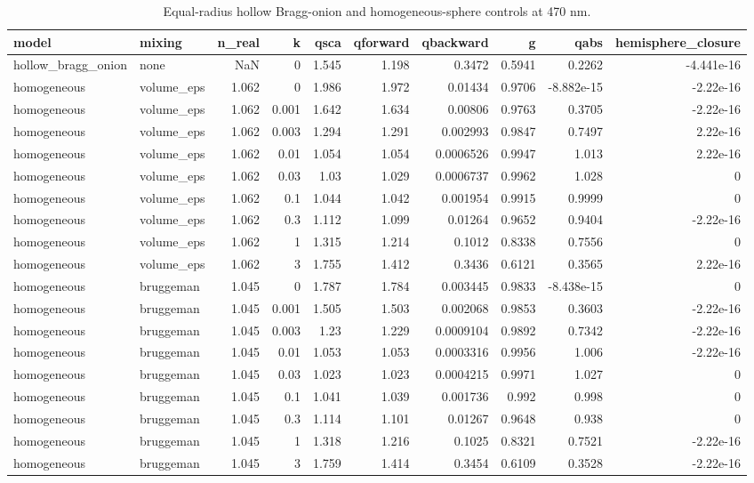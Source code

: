 \begin{table}
\caption{Equal-radius hollow Bragg-onion and homogeneous-sphere controls at 470 nm.}
\label{tab:homogeneous_controls_470nm}
\begin{tabular}{llrrrrrrrr}
\toprule
model & mixing & n\_real & k & qsca & qforward & qbackward & g & qabs & hemisphere\_closure \\
\midrule
hollow\_bragg\_onion & none & NaN & 0 & 1.545 & 1.198 & 0.3472 & 0.5941 & 0.2262 & -4.441e-16 \\
homogeneous & volume\_eps & 1.062 & 0 & 1.986 & 1.972 & 0.01434 & 0.9706 & -8.882e-15 & -2.22e-16 \\
homogeneous & volume\_eps & 1.062 & 0.001 & 1.642 & 1.634 & 0.00806 & 0.9763 & 0.3705 & -2.22e-16 \\
homogeneous & volume\_eps & 1.062 & 0.003 & 1.294 & 1.291 & 0.002993 & 0.9847 & 0.7497 & 2.22e-16 \\
homogeneous & volume\_eps & 1.062 & 0.01 & 1.054 & 1.054 & 0.0006526 & 0.9947 & 1.013 & 2.22e-16 \\
homogeneous & volume\_eps & 1.062 & 0.03 & 1.03 & 1.029 & 0.0006737 & 0.9962 & 1.028 & 0 \\
homogeneous & volume\_eps & 1.062 & 0.1 & 1.044 & 1.042 & 0.001954 & 0.9915 & 0.9999 & 0 \\
homogeneous & volume\_eps & 1.062 & 0.3 & 1.112 & 1.099 & 0.01264 & 0.9652 & 0.9404 & -2.22e-16 \\
homogeneous & volume\_eps & 1.062 & 1 & 1.315 & 1.214 & 0.1012 & 0.8338 & 0.7556 & 0 \\
homogeneous & volume\_eps & 1.062 & 3 & 1.755 & 1.412 & 0.3436 & 0.6121 & 0.3565 & 2.22e-16 \\
homogeneous & bruggeman & 1.045 & 0 & 1.787 & 1.784 & 0.003445 & 0.9833 & -8.438e-15 & 0 \\
homogeneous & bruggeman & 1.045 & 0.001 & 1.505 & 1.503 & 0.002068 & 0.9853 & 0.3603 & -2.22e-16 \\
homogeneous & bruggeman & 1.045 & 0.003 & 1.23 & 1.229 & 0.0009104 & 0.9892 & 0.7342 & -2.22e-16 \\
homogeneous & bruggeman & 1.045 & 0.01 & 1.053 & 1.053 & 0.0003316 & 0.9956 & 1.006 & -2.22e-16 \\
homogeneous & bruggeman & 1.045 & 0.03 & 1.023 & 1.023 & 0.0004215 & 0.9971 & 1.027 & 0 \\
homogeneous & bruggeman & 1.045 & 0.1 & 1.041 & 1.039 & 0.001736 & 0.992 & 0.998 & 0 \\
homogeneous & bruggeman & 1.045 & 0.3 & 1.114 & 1.101 & 0.01267 & 0.9648 & 0.938 & 0 \\
homogeneous & bruggeman & 1.045 & 1 & 1.318 & 1.216 & 0.1025 & 0.8321 & 0.7521 & -2.22e-16 \\
homogeneous & bruggeman & 1.045 & 3 & 1.759 & 1.414 & 0.3454 & 0.6109 & 0.3528 & -2.22e-16 \\
\bottomrule
\end{tabular}
\end{table}
